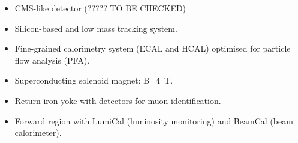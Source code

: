 \begin{frame}
\begin{columns}
    \begin{itemize}
    \item CMS-like detector (????? TO BE CHECKED)
    \item Silicon-based and low mass tracking system.
    \item Fine-grained calorimetry system (ECAL and HCAL) optimised
      for particle flow analysis (PFA).
    \item Superconducting solenoid magnet: B=4~T.
    \item Return iron yoke with detectors for muon identification.
    \item Forward region with LumiCal (luminosity monitoring) and
      BeamCal (beam calorimeter).
    \end{itemize}

  \end{columns}

\end{frame}

